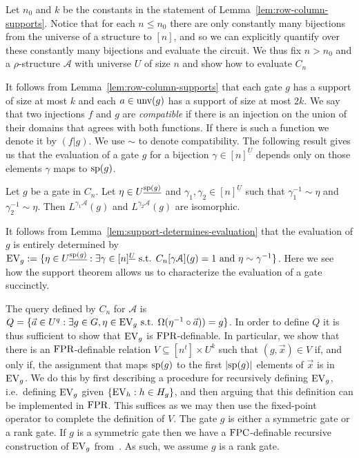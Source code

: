 \documentclass[a4paper,UKenglish]{lipics-v2018}
\begin{document}

Let $n_0$ and $k$ be the constants in the statement of
Lemma~\ref{lem:row-column-supports}. Notice that for each $n \leq n_0$ there are
only constantly many bijections from the universe of a structure to $[n]$, and
so we can explicitly quantify over these constantly many bijections and evaluate
the circuit. We thus fix $n > n_0$ and a $\rho$-structure $\mathcal{A}$ with
universe $U$ of size $n$ and show how to evaluate $C_n$

It follows from Lemma~\ref{lem:row-column-supports} that each gate $g$ has a
support of size at most $k$ and each $a \in \text{unv}(g)$ has a support of size
at most $2k$. We say that two injections $f$ and $g$ are \emph{compatible} if
there is an injection on the union of their domains that agrees with both
functions. If there is such a function we denote it by $(f \vert g)$. We use
$\sim$ to denote compatibility. The following result gives us that the
evaluation of a gate $g$ for a bijection $\gamma \in [n]^{\underline{U}}$
depends only on those elements $\gamma$ maps to $\text{sp}(g)$.

\begin{lemma}
	Let $g$ be a gate in $C_n$. Let $\eta \in U^{\underline{\text{sp}(g)}}$ and
  $\gamma_1, \gamma_2 \in [n]^{\underline{U}}$ such that $\gamma^{-1}_1 \sim
  \eta$ and $\gamma^{-1}_2 \sim \eta$. Then $L^{\gamma_1 \mathcal{A}}(g)$ and
  $L^{\gamma_2 \mathcal{A}}(g)$ are isomorphic.
	\label{lem:support-determines-evaluation}
\end{lemma}

It follows from Lemma~\ref{lem:support-determines-evaluation} that the
evaluation of $g$ is entirely determined by $\text{EV}_g := \{ \eta \in
U^{\underline{\text{sp}(g)}} : \exists \gamma \in [n]^{\underline{U}}\text{ s.t. }
C_n[\gamma \mathcal{A}](g) = 1 \text{ and } \eta \sim \gamma^{-1}\}$. Here we
see how the support theorem allows us to characterize the evaluation of a gate
succinctly.

The query defined by $C_n$ for $\mathcal{A}$ is $Q = \{ \vec{a} \in U^{q} :
\exists g \in G , \eta \in \text{EV}_g \text{ s.t. } \Omega(\eta^{-1}\circ \vec{a})) =
g\}$. In order to define $Q$ it is thus sufficient to show that $\text{EV}_g$ is
$\text{\upshape FPR}$-definable. In particular, we show that there is an $\text{\upshape FPR}$-definable
relation $V \subseteq [n^t] \times U^k$ such that $(g, \vec{x}) \in V$ if, and
only if, the assignment that maps $\text{sp}(g)$ to the first $\vert \text{sp}(g)
\vert$ elements of $\vec{x}$ is in $\text{EV}_g$. We do this by first describing a
procedure for recursively defining $\text{EV}_g$, i.e.\ defining $\text{EV}_g$ given
$\{\text{EV}_h : h \in H_g \}$, and then arguing that this definition can be
implemented in $\text{\upshape FPR}$. This suffices as we may then use the fixed-point operator
to complete the definition of $V$. The gate $g$ is either a symmetric gate or a
rank gate. If $g$ is a symmetric gate then we have a $\text{\upshape FPC}$-definable recursive
construction of $\text{EV}_g$ from~\cite{AndersonD17}. As such, we assume $g$ is a
rank gate.
\end{document}
